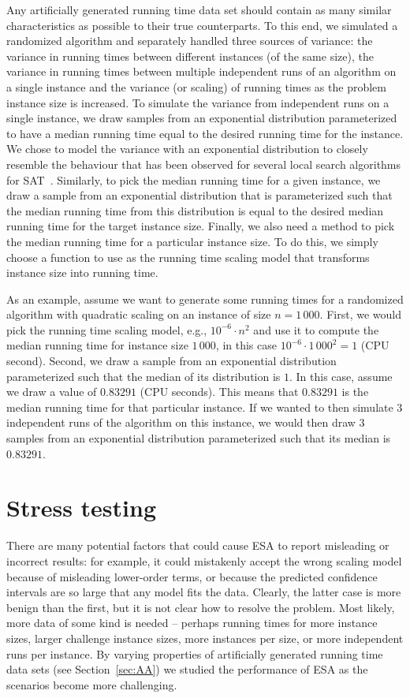 \documentclass[aic]{iosart2x}
\begin{document}
Any artificially generated running time data set should contain as many similar characteristics as possible to their true counterparts. To this end, we simulated a randomized algorithm and separately handled three sources of variance: the variance in running times between different instances (of the same size), the variance in running times between multiple independent runs of an algorithm on a single instance and the variance (or scaling) of running times as the problem instance size is increased. 
To simulate the variance from independent runs on a single instance, we draw samples from an exponential distribution parameterized to have a median running time equal to the desired running time for the instance. We chose to model the variance with an exponential distribution to closely resemble the behaviour that has been observed for several local search algorithms for SAT~\cite{HooStu99}. Similarly, to pick the median running time for a given instance, we draw a sample from an exponential distribution that is parameterized such that the median running time from this distribution is equal to the desired median running time for the target instance size. 
Finally, we also need a method to pick the median running time for a particular instance size. To do this, we simply choose a function to use as the running time scaling model that transforms instance size into running time. 

As an example, assume we want to generate some running times for a randomized algorithm with quadratic scaling on an instance of size $n = 1\,000$. First, we would pick the running time scaling model, e.g., $10^{-6} \cdot n^2$ and use it to compute the median running time for instance size $1\,000$, in this case $10^{-6} \cdot 1\,000^2 = 1$ (CPU second). Second, we draw a sample from an exponential distribution parameterized such that the median of its distribution is $1$. In this case, assume we draw a value of $0.83291$ (CPU seconds). This means that $0.83291$ is the median running time for that particular instance. If we wanted to then simulate 3 independent runs of the algorithm on this instance, we would then draw 3 samples from an exponential distribution parameterized such that its median is $0.83291$.

\section{Stress testing}
\label{sec:Stress Testing}

There are many potential factors that could cause ESA to report misleading or incorrect results: for example, it could mistakenly accept the wrong scaling model because of misleading lower-order terms, or because the predicted confidence intervals are so large that any model fits the data. Clearly, the latter case is more benign than the first, but it is not clear how to resolve the problem. Most likely, more data of some kind is needed -- perhaps running times for more instance sizes, larger challenge instance sizes, more instances per size, or more independent runs per instance. 
By varying properties of artificially generated running time data sets (see Section~\ref{sec:AA}) we studied the performance of ESA as the scenarios become more challenging. 
\end{document}

